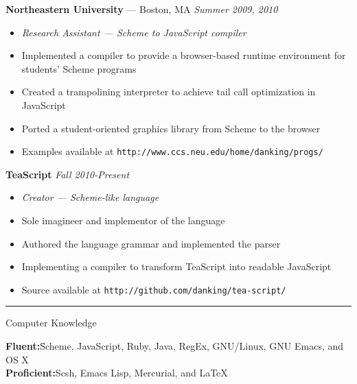 \documentclass[10pt]{letter}
\begin{document}
\begin{tabbing}
{\large \bf Northeastern University} --- Boston, MA \` \textit{Summer 2009, 2010}

\end{tabbing}
\begin{itemize}
\setlength\itemsep{1pt}
\item [] \textit{Research Assistant --- Scheme to JavaScript compiler}
\item Implemented a compiler to provide a browser-based runtime environment for students' Scheme programs
\item Created a trampolining interpreter to achieve tail call optimization in JavaScript
\item Ported a student-oriented graphics library from Scheme to the browser
\item Examples available at \texttt{http://www.ccs.neu.edu/home/danking/progs/}
\end{itemize}

\begin{tabbing}
{\large \bf TeaScript} \` \textit{Fall 2010-Present}
\end{tabbing}

\begin{itemize}
\setlength\itemsep{1pt}
\item [] \textit{Creator --- Scheme-like language}
\item Sole imagineer and implementor of the language
\item Authored the language grammar and implemented the parser
\item Implementing a compiler to transform TeaScript into readable JavaScript
\item Source available at \texttt{http://github.com/danking/tea-script/}
\end{itemize}



\rule{\linewidth}{.5pt}


{\Large Computer Knowledge}
\begin{tabbing}
\textbf{Fluent:}\hspace{.5in}\=Scheme, JavaScript, Ruby, Java, RegEx,
GNU/Linux, GNU Emacs, and OS X\\
\textbf{Proficient:}\>Scsh, Emacs Lisp, Mercurial, and \LaTeX
\end{tabbing}
\end{document}
